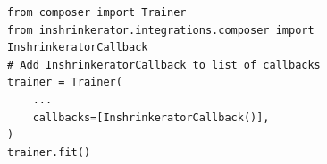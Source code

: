 \begin{lstlisting}[style=PyStyle,caption={\small 
 MosaicML Composer application with \sys callback integration.},label={lst:code-composer}]
from composer import Trainer
from inshrinkerator.integrations.composer import InshrinkeratorCallback
# Add InshrinkeratorCallback to list of callbacks
trainer = Trainer(
    ...
    callbacks=[InshrinkeratorCallback()],
)
trainer.fit()
\end{lstlisting}
